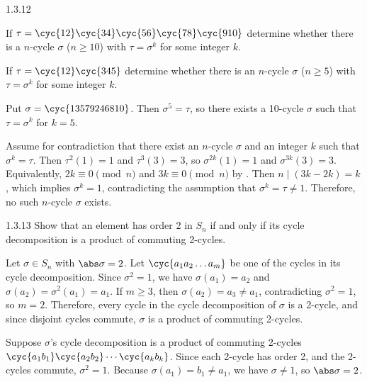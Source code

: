 \begin{exercise}{1.3.12}
    \begin{subexercises}
        \item If $\tau = \cyc{1 2}\cyc{3 4}\cyc{5 6}\cyc{7 8}\cyc{9 10}$ determine whether there is a $n$-cycle $\sigma$ ($n \geq 10$) with $\tau = \sigma^k$ for some integer $k$.
        \item If $\tau = \cyc{1 2}\cyc{3 4 5}$ determine whether there is an $n$-cycle $\sigma$ ($n \geq 5$) with $\tau = \sigma^k$ for some integer $k$.
    \end{subexercises}
\end{exercise}

\begin{solenum}
    \item Put $\sigma = \cyc{1 3 5 7 9 2 4 6 8 10}$.
	Then $\sigma^5 = \tau$, so there exists a 10-cycle $\sigma$ such that $\tau = \sigma^k$ for $k = 5$.
    \item Assume for contradiction that there exist an $n$-cycle $\sigma$ and an integer $k$ such that $\sigma^k = \tau$.
	Then $\tau^2(1) = 1$ and $\tau^3(3) = 3$, so $\sigma^{2k}(1) = 1$ and $\sigma^{3k}(3) = 3$.
    Equivalently, $2k \equiv 0 \pmod n$ and $3k \equiv 0 \pmod n$ by .
    Then $n \mid (3k - 2k) = k$, which implies $\sigma^k = 1$, contradicting the assumption that $\sigma^k = \tau \neq 1$.
    Therefore, no such $n$-cycle $\sigma$ exists.
\end{solenum}

\begin{exercise}{1.3.13}
    Show that an element has order 2 in $S_n$ if and only if its cycle decomposition is a product of commuting 2-cycles.
\end{exercise}

\begin{soliff}
    \rightimp Let $\sigma \in S_n$ with $\abs\sigma = 2$.
	Let $\cyc{a_1 a_2 \ldots{} a_m}$ be one of the cycles in its cycle decomposition.
	Since $\sigma^2 = 1$, we have $\sigma(a_1) = a_2$ and $\sigma(a_2) = \sigma^2(a_1) = a_1$.
    If $m \geq 3$, then $\sigma(a_2) = a_3 \neq a_1$, contradicting $\sigma^2 = 1$, so $m = 2$.
    Therefore, every cycle in the cycle decomposition of $\sigma$ is a 2-cycle, and since disjoint cycles commute, $\sigma$ is a product of commuting 2-cycles.

    \leftimp Suppose $\sigma$'s cycle decomposition is a product of commuting 2-cycles $\cyc{a_1 b_1}\cyc{a_2 b_2} \cdots \cyc{a_k b_k}$.
	Since each 2-cycle has order 2, and the 2-cycles commute, $\sigma^2 = 1$.
    Because $\sigma(a_1) = b_1 \neq a_1$, we have $\sigma \neq 1$, so $\abs\sigma = 2$.
\end{soliff}

